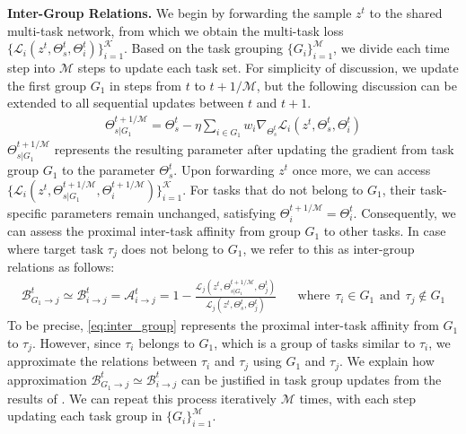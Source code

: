\textbf{Inter-Group Relations.} We begin by forwarding the sample $z^t$ to the shared multi-task network, from which we obtain the multi-task loss $\{\mathcal{L}_i (z^t, \Theta_s^t, \Theta_i^t)\}_{i=1}^{\mathcal{K}}$. Based on the task grouping $\{G_i\}_{i=1}^{\mathcal{M}}$, we divide each time step into $\mathcal{M}$ steps to update each task set. For simplicity of discussion, we update the first group $G_1$ in steps from $t$ to $t+1/\mathcal{M}$, but the following discussion can be extended to all sequential updates between $t$ and $t+1$.
\begin{align}
    \Theta_{s|G_1}^{t+1/\mathcal{M}} = \Theta_s^t-\eta \sum_{i \in G_1} w_i \nabla_{\Theta_s^t} \mathcal{L}_i(z^t, \Theta_s^t, \Theta_i^t)
\end{align}
$\Theta_{s|G_1}^{t+1/\mathcal{M}}$ represents the resulting parameter after updating the gradient from task group $G_1$ to the parameter $\Theta_s^t$. Upon forwarding $z^t$ once more, we can access $\{\mathcal{L}_i (z^t, \Theta_{s|G_1}^{t+1/\mathcal{M}}, \Theta_i^{t+1/\mathcal{M}})\}_{i=1}^{\mathcal{K}}$. For tasks that do not belong to $G_1$, their task-specific parameters remain unchanged, satisfying $\Theta_i^{t+1/\mathcal{M}} = \Theta_i^t$. Consequently, we can assess the proximal inter-task affinity from group $G_1$ to other tasks. In case where target task $\tau_j$ does not belong to $G_1$, we refer to this as inter-group relations as follows:
\begin{align}
    \mathcal{B}^t_{G_1\rightarrow j} \simeq \mathcal{B}^t_{i\rightarrow j} = \mathcal{A}^t_{i\rightarrow j} = 1- \frac{\mathcal{L}_j(z^t, \Theta_{s|G_1}^{t+1/\mathcal{M}}, \Theta_j^t)}{\mathcal{L}_j(z^t, \Theta_{s}^{t}, \Theta_j^t)} \hspace{20pt}\text{where}\hspace{5pt} \tau_i\in G_1 \hspace{5pt}\text{and}\hspace{5pt} \tau_j \notin G_1
\label{eq:inter_group}
\end{align}
To be precise, \cref{eq:inter_group} represents the proximal inter-task affinity from $G_1$ to $\tau_j$. However, since $\tau_i$ belongs to $G_1$, which is a group of tasks similar to $\tau_i$, we approximate the relations between $\tau_i$ and $\tau_j$ using $G_1$ and $\tau_j$. We explain how approximation $\mathcal{B}^t_{G_1\rightarrow j} \simeq \mathcal{B}^t_{i\rightarrow j}$ can be justified in task group updates from the results of . We can repeat this process iteratively $\mathcal{M}$ times, with each step updating each task group in $\{G_i\}_{i=1}^{\mathcal{M}}$.

